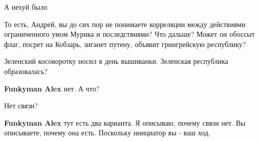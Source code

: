 \begin{itemize}
 
А нехуй было

 

То есть, Андрей, вы до сих пор не понимаете корреляции между действиями
ограниченного умом Мурика и последствиями? Что дальше? Может он обоссыт флаг,
посрет на Кобзарь, зиганет путену, объявит грингрейскую республику?

\begin{itemize}
 
Зеленский косоворотку носил в день вышиванки. Зеленская республика образовалась?

 
\textbf{Funkyman Alex} нет. А что?

 
Нет связи?

 
\textbf{Funkyman Alex} тут есть два варианта. Я описываю, почему связи нет. Вы описываете, почему она есть. Поскольку инициатор вы - ваш ход.


\end{itemize}
\end{itemize}
